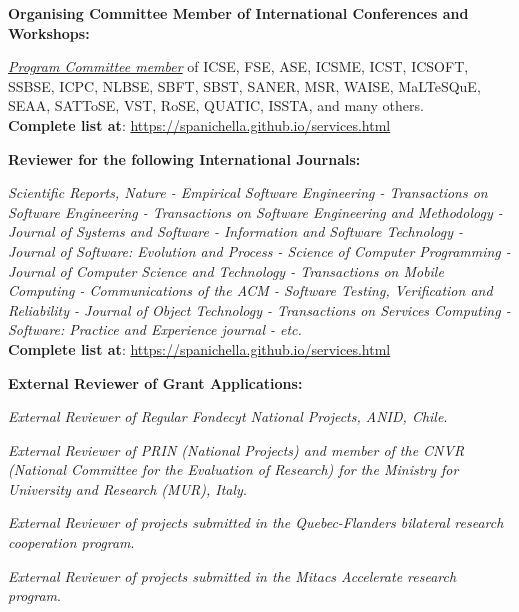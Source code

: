 \documentclass[11pt]{article}
\begin{document}
\medskip 

\textbf{Organising Committee Member of International Conferences and Workshops:}
\begin{innerlist}
 \item \href{https://spanichella.github.io/services.html}{\textit{Program Committee member}} of ICSE, FSE, ASE, ICSME, ICST, ICSOFT, SSBSE, ICPC, NLBSE, SBFT, SBST, SANER, MSR, WAISE, MaLTeSQuE, SEAA, SATToSE, VST, RoSE, QUATIC, ISSTA, and many others. 
 \\\textbf{Complete list at}: \href{https://spanichella.github.io/services.html}{https://spanichella.github.io/services.html}
\end{innerlist}

\medskip 

\textbf{Reviewer for the following International Journals:}
\begin{innerlist}
\item \emph{Scientific Reports, Nature - Empirical Software Engineering - Transactions on Software Engineering - Transactions on Software Engineering and Methodology - Journal of Systems and Software - Information and Software Technology - Journal of Software: Evolution and Process - Science of Computer Programming - Journal of Computer Science and Technology - Transactions on Mobile Computing - Communications of the ACM - Software Testing, Verification and Reliability - Journal of Object Technology - Transactions on Services Computing - Software: Practice and Experience journal - etc.} 
\\ \textbf{Complete list at}: \href{https://spanichella.github.io/services.html}{https://spanichella.github.io/services.html}
\end{innerlist} 

\medskip 

\textbf{External Reviewer of Grant Applications:}
\begin{innerlist}
   \item \emph{External Reviewer of Regular Fondecyt National Projects, ANID, Chile}.
   \item \emph{External Reviewer of PRIN (National Projects) and member of the CNVR (National Committee for the Evaluation of Research) for the Ministry for University and Research (MUR), Italy}.
   \item \emph{External Reviewer of projects submitted in the Quebec-Flanders bilateral research cooperation program}.
   \item \emph{External Reviewer of projects submitted in the Mitacs Accelerate research program}.
\end{innerlist}
\end{document}
